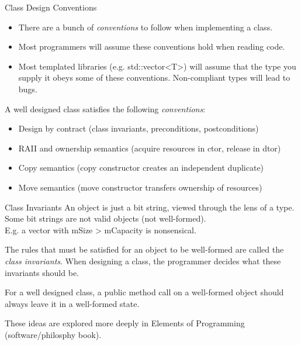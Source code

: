 \begin{frame}[fragile]{Class Design Conventions}
  \begin{itemize}
    \item There are a bunch of \emph{conventions} to follow when implementing a class.
    \item Most programmers will assume these conventions hold when reading code.
    \item Most templated libraries (e.g. std::vector<T>) will assume that the type 
    you supply it obeys some of these conventions. Non-compliant types will lead to bugs.
  \end{itemize}

  A well designed class satisfies the following \emph{conventions}:
  \begin{itemize}
    \item Design by contract (class invariants, preconditions, postconditions)
    \item RAII and ownership semantics (acquire resources in ctor, release in dtor)
    \item Copy semantics (copy constructor creates an independent duplicate)
    \item Move semantics (move constructor transfers ownership of resources)
  \end{itemize}
\end{frame}

\begin{frame}[fragile]{Class Invariants}
  An object is just a bit string, viewed through the lens of a type.\\
  Some bit strings are not valid objects (not well-formed).\\
  E.g. a vector with mSize > mCapacity is nonsensical.\\

  \begin{sqt:definition}
    The rules that must be satisfied for an object to be well-formed are called the \emph{class invariants}.
    When designing a class, the programmer decides what these invariants should be.
  \end{sqt:definition}

  \begin{sqt:result}
    For a well designed class, a public method call on a well-formed object should always leave it in a well-formed state.
  \end{sqt:result}

  These ideas are explored more deeply in Elements of Programming (software/philosphy book).
\end{frame}

